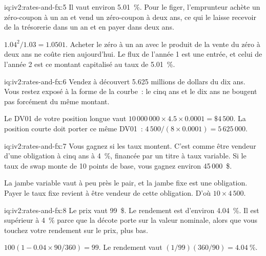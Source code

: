 \begin{solution}{iq:iv2:rates-and-fx:5}
Il vaut environ 5.01~\%. Pour le figer, l'emprunteur achète un zéro-coupon à un an et vend un zéro-coupon à deux ans, ce qui le laisse recevoir de la trésorerie dans un an et en payer dans deux ans.

$1.04^2/1.03 = 1.0501$. Acheter le zéro à un an avec le produit de la vente du zéro à deux ans ne coûte rien aujourd'hui. Le flux de l'année 1 est une entrée, et celui de l'année 2 est ce montant capitalisé au taux de 5.01~\%.

\end{solution}

\begin{solution}{iq:iv2:rates-and-fx:6}
Vendez à découvert 5.625 millions de dollars du dix ans. Vous restez exposé à la forme de la courbe~: le cinq ans et le dix ans ne bougent pas forcément du même montant.

Le DV01 de votre position longue vaut $10\,000\,000 \times 4.5 \times 0.0001 = \$4\,500$. La position courte doit porter ce même DV01~: $4\,500/(8 \times 0.0001) = 5\,625\,000$.

\end{solution}

\begin{solution}{iq:iv2:rates-and-fx:7}
Vous gagnez si les taux montent. C'est comme être vendeur d'une obligation à cinq ans à 4~\%, financée par un titre à taux variable. Si le taux de swap monte de 10 points de base, vous gagnez environ 45\,000~\$.

La jambe variable vaut à peu près le pair, et la jambe fixe est une obligation. Payer le taux fixe revient à être vendeur de cette obligation. D'où $10 \times 4\,500$.

\end{solution}

\begin{solution}{iq:iv2:rates-and-fx:8}
Le prix vaut 99~\$. Le rendement est d'environ 4.04~\%. Il est supérieur à 4~\% parce que la décote porte sur la valeur nominale, alors que vous touchez votre rendement sur le prix, plus bas.

$100(1 - 0.04 \times 90/360) = 99$. Le rendement vaut $(1/99)(360/90) = 4.04~\%$.

\end{solution}

